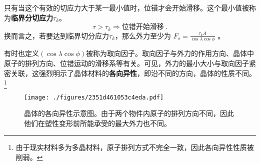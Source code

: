 只有当这个有效的切应力大于某一最小值时，位错才会开始滑移。这个最小值被称为\textbf{临界分切应力$\tau_k$}。
$$
\tau>\tau_k\Rightarrow\text{位错开始滑移}~.
$$
换而言之，若要达到临界切分应力$\tau_k$，那么外力至少为 $F_s=\frac{\tau_k A}{\cos \lambda \cos \phi} $ 。

有时也定义$(\cos \lambda \cos \phi)$被称为取向因子。取向因子与外力的作用方向、晶体中原子的排列方向、位错运动的滑移系等有关。可见，外力的最小大小与取向因子紧密关联，这强烈明示了晶体材料的\textbf{各向异性}，即沿不同的方向，晶体的性质不同。\footnote{由于现实材料多为多晶材料，原子排列方式不完全一致，因此各向异性性质被削弱。}

\begin{figure}[ht]
\centering
\texttt{[image: ./figures/2351d461053c4eda.pdf]}
\caption{晶体的各向异性示意图。由于两个物件内原子的排列方向不同，因此他们在塑性变形前所能承受的最大外力也不同。} \label{fig_MetDfm_9}
\end{figure}

